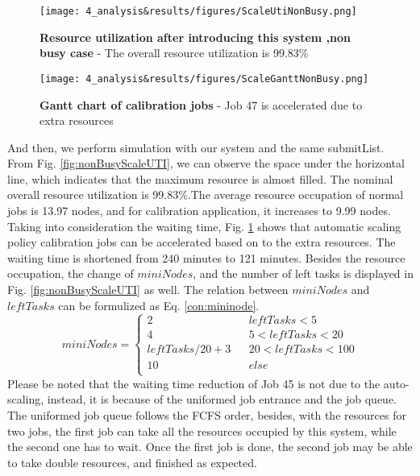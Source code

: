 \begin{figure}
    \centering
    \begin{minipage}{.48\textwidth}
      \centering
      \texttt{[image: 4\_analysis\&results/figures/ScaleUtiNonBusy.png]}
      \caption[Resource utilization after introducing this system ,non busy case]{{\small\textbf{Resource utilization after introducing this system ,non busy case} - The overall resource utilization is 99.83\%}}
      \label{fig:nonBusyScaleUTI}
    \end{minipage} 
    \begin{minipage}{.48\textwidth}
      \centering
      \texttt{[image: 4\_analysis\&results/figures/ScaleGanttNonBusy.png]}
      \caption[Gantt chart of calibration jobs]{{\small\textbf{Gantt chart of calibration jobs} - Job 47 is accelerated due to extra resources }}
      \label{fig:nonBusyScalegantt}
    \end{minipage}
\end{figure}
And then, we perform simulation with our system and the same submitList. From Fig. \ref{fig:nonBusyScaleUTI}, we can observe the space under the horizontal line, which indicates that the maximum resource is almost filled.
The nominal overall resource utilization is  99.83\%.The average resource occupation of normal jobs is 13.97 nodes, and for calibration application, it increases to 9.99 nodes.
Taking into consideration the waiting time, Fig. \ref{fig:nonBusyScalegantt} shows that automatic scaling policy calibration jobs can be accelerated based on to the extra resources.
The waiting time is shortened from 240 minutes to 121 minutes. Besides the resource occupation, the change of $miniNodes$, and the number of left tasks is displayed in Fig. \ref{fig:nonBusyScaleUTI} as well.
The relation between $miniNodes$ and $leftTasks$ can be formulized as Eq. \eqref{con:mininode}.
\begin{equation}
    miniNodes=\left\{
        \begin{aligned}
        2 &      & {leftTasks      <      5}\\
        4 &      & {5< leftTasks      <      20}\\
        leftTasks/20+3 &      & {20< leftTasks      <      100}\\
        10 &      & {else}\\
        \end{aligned}
        \right.\label{con:mininode}
\end{equation}
Please be noted that the waiting time reduction of Job 45 is not due to the auto-scaling, instead, it is because of the uniformed job entrance and the job queue.
The uniformed job queue follows the FCFS order, besides, with the resources for two jobs, the first job can take all the resources occupied by this system, while the second one has to wait. 
Once the first job is done, the second job may be able to take double resources, and finished as expected.

